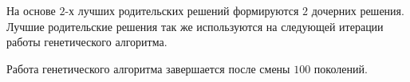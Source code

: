 На основе $2$-х лучших родительских решений формируются $2$ дочерних решения. Лучшие родительские решения так же используются на следующей итерации работы генетического алгоритма.

Работа генетического алгоритма завершается после смены $100$ поколений.
